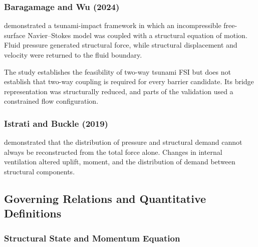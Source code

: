 %

\subsubsection{Baragamage and Wu (2024)}
\label{sec:res-str-fsi-evidence-baragamage-2024}

\textcite{baragamage2024fullycoupled} demonstrated a tsunami-impact
framework in which an incompressible free-surface Navier--Stokes model
was coupled with a structural equation of motion. Fluid pressure
generated structural force, while structural displacement and velocity
were returned to the fluid boundary.

The study establishes the feasibility of two-way tsunami FSI but does
not establish that two-way coupling is required for every barrier
candidate. Its bridge representation was structurally reduced, and
parts of the validation used a constrained flow configuration.

\subsubsection{Istrati and Buckle (2019)}
\label{sec:res-str-fsi-evidence-istrati-2019}

\textcite{istrati2019trappedair} demonstrated that the distribution of
pressure and structural demand cannot always be reconstructed from the
total force alone. Changes in internal ventilation altered uplift,
moment, and the distribution of demand between structural components.

\subsection{Governing Relations and Quantitative Definitions}
\label{sec:res-str-fsi-governing-relations}

%

\subsubsection{Structural State and Momentum Equation}
\label{sec:res-str-fsi-structural-equations}

